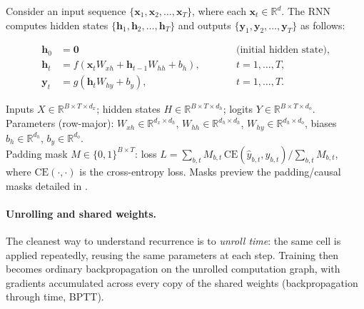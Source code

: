 Consider an input sequence \(\{\mathbf{x}_1, \mathbf{x}_2, \ldots, \mathbf{x}_T\}\), where each \(\mathbf{x}_t \in \mathbb{R}^d\). The RNN computes hidden states \(\{\mathbf{h}_1, \mathbf{h}_2, \ldots, \mathbf{h}_T\}\) and outputs \(\{\mathbf{y}_1, \mathbf{y}_2, \ldots, \mathbf{y}_T\}\) as follows:

\begin{equation}\label{eq:rnn_state_update}
    \begin{aligned}
        \mathbf{h}_0 &= \mathbf{0} \qquad &&\text{(initial hidden state)},\\
        \mathbf{h}_t &= f(\mathbf{x}_t W_{xh} + \mathbf{h}_{t-1} W_{hh} + b_h), \qquad &&t=1,\ldots, T,\\
        \mathbf{y}_t &= g(\mathbf{h}_t W_{hy} + b_y), \qquad &&t=1,\ldots, T.
    \end{aligned}
\end{equation}

\begin{tcolorbox}[summarybox, title={Shapes and masks (batch $B$, time $T$)}]
Inputs \(X \in \mathbb{R}^{B\times T \times d_x}\); hidden states \(H \in \mathbb{R}^{B\times T \times d_h}\); logits \(Y \in \mathbb{R}^{B\times T \times d_o}\). Parameters (row-major): \(W_{xh}\in\mathbb{R}^{d_x\times d_h}\), \(W_{hh}\in\mathbb{R}^{d_h\times d_h}\), \(W_{hy}\in\mathbb{R}^{d_h\times d_o}\), biases \(b_h\in\mathbb{R}^{d_h}\), \(b_y\in\mathbb{R}^{d_o}\).\\
Padding mask \(M\in\{0,1\}^{B\times T}\): loss \(L=\sum_{b, t} M_{b, t}\,\text{CE}(\hat y_{b, t}, y_{b, t})/\sum_{b, t} M_{b, t}\), where \(\text{CE}(\cdot,\cdot)\) is the cross-entropy loss. Masks preview the padding/causal masks detailed in .
\end{tcolorbox}
\paragraph{Unrolling and shared weights.}
The cleanest way to understand recurrence is to \emph{unroll time}: the same cell is applied repeatedly, reusing the same parameters at each step. Training then becomes ordinary backpropagation on the unrolled computation graph, with gradients accumulated across every copy of the shared weights (backpropagation through time, BPTT).

